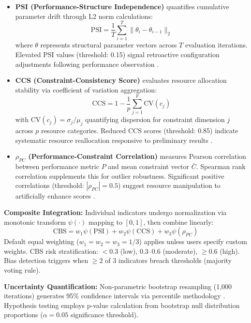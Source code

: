 \documentclass[10pt]{article}
\begin{document}
\begin{itemize}
    \item \textbf{PSI (Performance-Structure Independence)} quantifies cumulative parameter drift through L2 norm calculations:
    \[
    \text{PSI} = \frac{1}{T} \sum_{i=1}^{T} \| \theta_i - \theta_{i-1} \|_2
    \]
    where $\theta$ represents structural parameter vectors across $T$ evaluation iterations. Elevated PSI values (threshold: 0.15) signal retroactive configuration adjustments following performance observation \cite{nosek2018preregistration}.
    
    \item \textbf{CCS (Constraint-Consistency Score)} evaluates resource allocation stability via coefficient of variation aggregation:
    \[
    \text{CCS} = 1 - \frac{1}{p} \sum_{j=1}^{p} \text{CV}(c_j)
    \]
    with $\text{CV}(c_j) = \sigma_j/\mu_j$ quantifying dispersion for constraint dimension $j$ across $p$ resource categories. Reduced CCS scores (threshold: 0.85) indicate systematic resource reallocation responsive to preliminary results \cite{lipton2019troubling}.
    
    \item \textbf{$\rho_{PC}$ (Performance-Constraint Correlation)} measures Pearson correlation between performance metric $P$ and mean constraint vector $\bar{C}$. Spearman rank correlation supplements this for outlier robustness. Significant positive correlations (threshold: $|\rho_{PC}| = 0.5$) suggest resource manipulation to artificially enhance scores \cite{sculley2015debt}.
\end{itemize}

\textbf{Composite Integration:} Individual indicators undergo normalization via monotonic transform $\psi(\cdot)$ mapping to $[0,1]$, then combine linearly:
\[
\text{CBS} = w_1 \psi(\text{PSI}) + w_2 \psi(\text{CCS}) + w_3 \psi(\rho_{PC})
\]
Default equal weighting ($w_1 = w_2 = w_3 = 1/3$) applies unless users specify custom weights. CBS risk stratification: $< 0.3$ (low), $0.3$--$0.6$ (moderate), $\geq 0.6$ (high). Bias detection triggers when $\geq2$ of 3 indicators breach thresholds (majority voting rule).

\textbf{Uncertainty Quantification:} Non-parametric bootstrap resampling (1,000 iterations) generates 95\% confidence intervals via percentile methodology \cite{efron1994bootstrap}. Hypothesis testing employs p-value calculation from bootstrap null distribution proportions ($\alpha = 0.05$ significance threshold).
\end{document}
